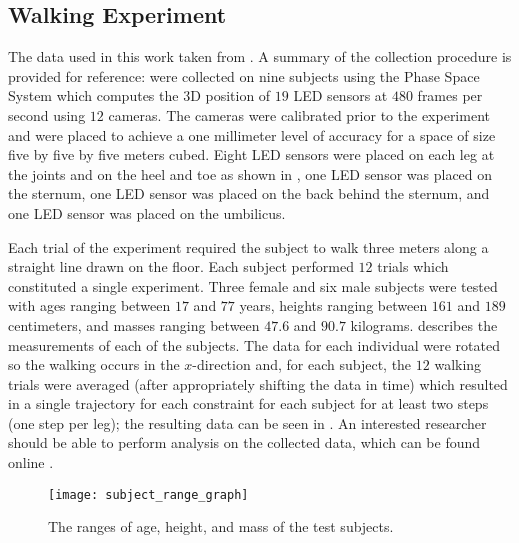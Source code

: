 \subsection{Walking Experiment}
The data used in this work taken from \cite{}.
%
A summary of the collection procedure is provided for reference:
%
were collected on nine subjects using the Phase Space System \cite{phasespace}
which computes the 3D position of $19$ LED sensors at $480$ frames per second
using $12$ cameras.
%
The cameras were calibrated prior to the experiment and were placed to achieve a
one millimeter level of accuracy for a space of size five by five by five meters
cubed.
%
Eight LED sensors were placed on each leg at the joints and on the heel and toe
as shown in , one LED sensor was placed on the sternum, one
LED sensor was placed on the back behind the sternum, and one LED sensor was
placed on the umbilicus.

Each trial of the experiment required the subject to walk three meters along a
straight line drawn on the floor.
%
Each subject performed $12$ trials which constituted a single experiment.
%
Three female and six male subjects were tested with ages ranging between $17$
and $77$ years, heights ranging between $161$ and $189$ centimeters, and masses
ranging between $47.6$ and $90.7$ kilograms.
%
 describes the measurements of each of the subjects.
%
The data for each individual were rotated so the walking occurs in the
$x$-direction and, for each subject, the $12$ walking trials were averaged
(after appropriately shifting the data in time) which resulted in a single
trajectory for each constraint for each subject for at least two steps (one step
per leg);
%
the resulting data can be seen in .
%
An interested researcher should be able to perform analysis on the collected
data, which can be found online \cite{ourdataset}.

\begin{figure}[t!]
  \centering
  \texttt{[image: subject\_range\_graph]}
  \caption{The ranges of age, height, and mass of the test subjects.}
  \label{fig:subject-ranges}
\end{figure}

